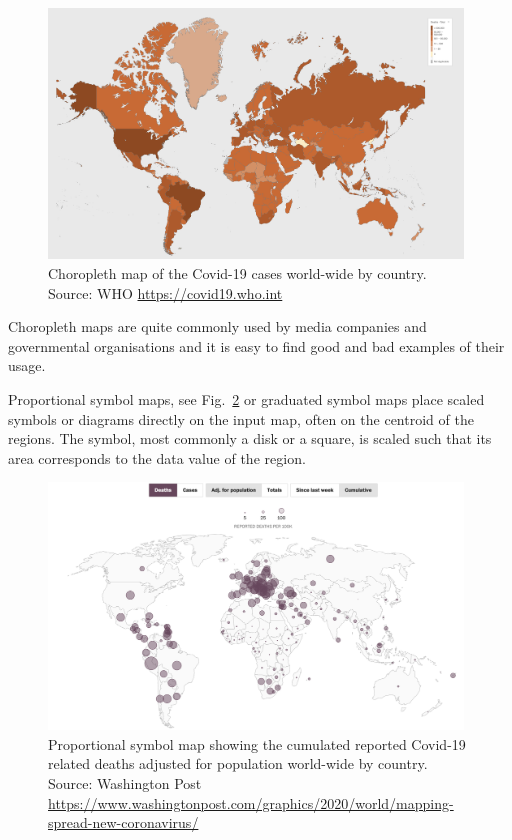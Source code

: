 \documentclass[article]{jdssv}\usepackage[]{graphicx}\usepackage[]{color}
\begin{document}
\begin{figure}
	\includegraphics[width = 0.98\textwidth]{Figures_Web/who_totalcases_choro.png}
	\caption{Choropleth map of the Covid-19 cases world-wide by country. Source: WHO \url{https://covid19.who.int}}
	\label{fig:choro1}
\end{figure}

Choropleth maps are quite commonly used by media companies and governmental organisations and it is easy to find good and bad examples of their usage.

Proportional symbol maps, see Fig.~\ref{fig:propsymb} or graduated symbol maps place scaled symbols or diagrams directly on the input map, often on the centroid of the regions. The symbol, most commonly a disk or a square, is scaled such that its area corresponds to the data value of the region.


\begin{figure}
	\includegraphics[width = 0.98\textwidth]{Figures_Web/wp_totaldeaths_propsymb.png}
	\caption{Proportional symbol map showing the cumulated reported Covid-19 related deaths adjusted for population world-wide by country. Source: Washington Post \url{https://www.washingtonpost.com/graphics/2020/world/mapping-spread-new-coronavirus/}}
	\label{fig:propsymb}
\end{figure}
\end{document}

